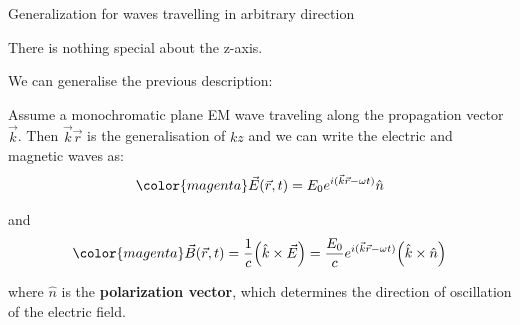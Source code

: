 %
%
%

\begin{frame}{Generalization for waves travelling in arbitrary direction}

There is nothing special about the z-axis.\\

\vspace{0.2cm}

We can generalise the previous description:\\

\vspace{0.1cm}

Assume a monochromatic plane EM wave traveling along the
propagation vector $\vec{k}$.
Then $\vec{k} \vec{r}$ is the generalisation of $kz$ and we can write the electric
and magnetic waves as:
\begin{equation*}
     {\color{magenta} \vec{E}(\vec{r},t) = E_0  e^{i (\vec{k} \vec{r} -\omega t)} \hat{n} }
\end{equation*}

and
\begin{equation*}
     {\color{magenta}
           \vec{B}(\vec{r},t) =
                \frac{1}{c}  \Big( \hat{k} \times \vec{E} \Big) =
                \frac{E_0}{c}  e^{i ( \vec{k} \vec{r} -\omega t)} \Big( \hat{k} \times \hat{n} \Big)
     }
\end{equation*}

\vspace{0.3cm}
where $\hat{n}$ is the {\bf polarization vector}, which determines the direction of oscillation of
the electric field.


\end{frame}

%
%
%


